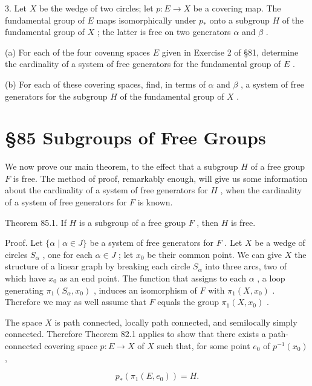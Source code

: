 \documentclass[10pt]{article}
\begin{document}
3. Let \(X\) be the wedge of two circles; let \(p : E \rightarrow  X\) be a covering map. The fundamental group of \(E\) maps isomorphically under \({p}_{ * }\) onto a subgroup \(H\) of the fundamental group of \(X\) ; the latter is free on two generators \(\alpha\) and \(\beta\) .

(a) For each of the four covenng spaces \(E\) given in Exercise 2 of §81, determine the cardinality of a system of free generators for the fundamental group of \(E\) .

(b) For each of these covering spaces, find, in terms of \(\alpha\) and \(\beta\) , a system of free generators for the subgroup \(H\) of the fundamental group of \(X\) .

\section*{§85 Subgroups of Free Groups}

We now prove our main theorem, to the effect that a subgroup \(H\) of a free group \(F\) is free. The method of proof, remarkably enough, will give us some information about the cardinality of a system of free generators for \(H\) , when the cardinality of a system of free generators for \(F\) is known.

Theorem 85.1. If \(H\) is a subgroup of a free group \(F\) , then \(H\) is free.

Proof. Let \(\{ \alpha  \mid  \alpha  \in  J\}\) be a system of free generators for \(F\) . Let \(X\) be a wedge of circles \({S}_{\alpha }\) , one for each \(\alpha  \in  J\) ; let \({x}_{0}\) be their common point. We can give \(X\) the structure of a linear graph by breaking each circle \({S}_{\alpha }\) into three arcs, two of which have \({x}_{0}\) as an end point. The function that assigns to each \(\alpha\) , a loop generating \({\pi }_{1}\left( {{S}_{\alpha },{x}_{0}}\right)\) , induces an isomorphism of \(F\) with \({\pi }_{1}\left( {X,{x}_{0}}\right)\) . Therefore we may as well assume that \(F\) equals the group \({\pi }_{1}\left( {X,{x}_{0}}\right)\) .

The space \(X\) is path connected, locally path connected, and semilocally simply connected. Therefore Theorem 82.1 applies to show that there exists a path-connected covering space \(p : E \rightarrow  X\) of \(X\) such that, for some point \({e}_{0}\) of \({p}^{-1}\left( {x}_{0}\right)\) ,

\[
{p}_{ * }\left( {{\pi }_{1}\left( {E,{e}_{0}}\right) }\right)  = H.
\]
\end{document}
